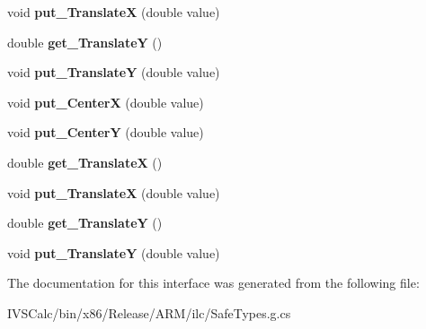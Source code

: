 \begin{DoxyCompactItemize}
void {\bfseries put\+\_\+\+TranslateX} (double value)
\item 
\mbox{\label{interface_windows_1_1_u_i_1_1_xaml_1_1_media_1_1_i_composite_transform_ab69da6f2ebd1b82e0297f6247079a32b}} 
double {\bfseries get\+\_\+\+TranslateY} ()
\item 
\mbox{\label{interface_windows_1_1_u_i_1_1_xaml_1_1_media_1_1_i_composite_transform_a4eef58c622c9fdad76754e50e5da2b53}} 
void {\bfseries put\+\_\+\+TranslateY} (double value)
\item 
\mbox{\label{interface_windows_1_1_u_i_1_1_xaml_1_1_media_1_1_i_composite_transform_a7d6d85f88b20215ed3ea38303a205255}} 
void {\bfseries put\+\_\+\+CenterX} (double value)
\item 
\mbox{\label{interface_windows_1_1_u_i_1_1_xaml_1_1_media_1_1_i_composite_transform_ac24af59d7b97c179e5bf45344b26e960}} 
void {\bfseries put\+\_\+\+CenterY} (double value)
\item 
\mbox{\label{interface_windows_1_1_u_i_1_1_xaml_1_1_media_1_1_i_composite_transform_a1f9c47e34c9e72063f04ffdec31b862a}} 
double {\bfseries get\+\_\+\+TranslateX} ()
\item 
\mbox{\label{interface_windows_1_1_u_i_1_1_xaml_1_1_media_1_1_i_composite_transform_ac99780ca6fd6f99772988eb2955d55eb}} 
void {\bfseries put\+\_\+\+TranslateX} (double value)
\item 
\mbox{\label{interface_windows_1_1_u_i_1_1_xaml_1_1_media_1_1_i_composite_transform_ab69da6f2ebd1b82e0297f6247079a32b}} 
double {\bfseries get\+\_\+\+TranslateY} ()
\item 
\mbox{\label{interface_windows_1_1_u_i_1_1_xaml_1_1_media_1_1_i_composite_transform_a4eef58c622c9fdad76754e50e5da2b53}} 
void {\bfseries put\+\_\+\+TranslateY} (double value)
\end{DoxyCompactItemize}


The documentation for this interface was generated from the following file\+:\begin{DoxyCompactItemize}
\item 
I\+V\+S\+Calc/bin/x86/\+Release/\+A\+R\+M/ilc/Safe\+Types.\+g.\+cs\end{DoxyCompactItemize}
